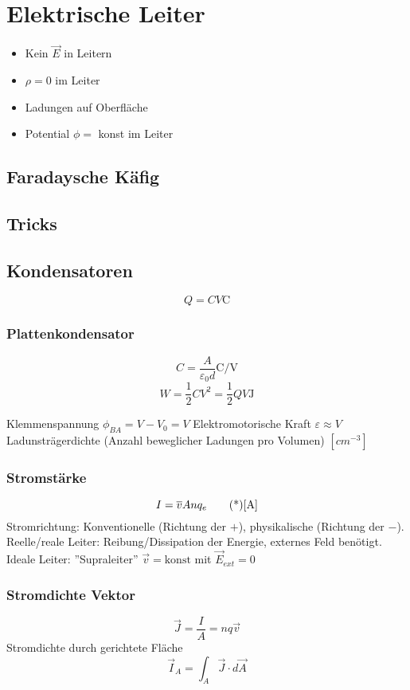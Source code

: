 \section{Elektrische Leiter}
\begin{itemize}
    \item Kein $\Vec{E}$ in Leitern
    \item $\rho = 0$ im Leiter 
    \item Ladungen auf Oberfläche
    \item Potential $\phi = $ konst im Leiter 
\end{itemize}

\subsection{Faradaysche Käfig}

\subsection{Tricks}

\subsection{Kondensatoren}
\[Q = C V \unit{\coulomb}\]

\subsubsection{Plattenkondensator}
\[C = \frac{A }{\varepsilon_0d} \unit{\coulomb \per \volt}\]
\[W = \frac{1}{2} C V^2= \frac{1}{2}Q V \unit{\joule}\]

Klemmenspannung $\phi_{BA} = V-V_0=V$
Elektromotorische Kraft $\varepsilon \approx V$
Ladunsträgerdichte (Anzahl beweglicher Ladungen pro Volumen) $[cm^{-3}]$

\subsubsection{Stromstärke}
\[I = \quer{v} A n q_e \unit{\ampere}\]
Stromrichtung: Konventionelle (Richtung der $+$), physikalische (Richtung der $-$). Reelle/reale Leiter: Reibung/Dissipation der Energie, externes Feld benötigt. Ideale Leiter: ''Supraleiter'' $\Vec{v} = \text{konst}$ mit $\Vec{E}_{ext} = 0$ 

\subsubsection{Stromdichte Vektor}
\[\Vec{J} = \frac{I}{A} = n q \Vec{v}\]
Stromdichte durch gerichtete Fläche
\[\Vec{I}_A = \int_A\Vec{J}\cdot d \Vec{A}\]

